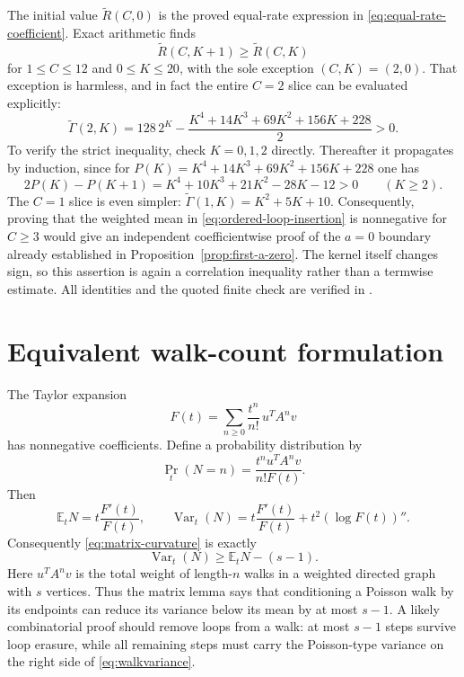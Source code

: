 \documentclass[11pt]{article}
\newcommand{\E}{\mathbb E}
\newcommand{\Var}{\operatorname{Var}}
\theoremstyle{remark}
\begin{document}
The initial value $\widetilde R(C,0)$ is the proved equal-rate expression
in \eqref{eq:equal-rate-coefficient}.  Exact arithmetic finds
\[
 \widetilde R(C,K+1)\geq\widetilde R(C,K)
\]
for $1\leq C\leq12$ and $0\leq K\leq20$, with the sole exception
$(C,K)=(2,0)$.  That exception is harmless, and in fact the entire
$C=2$ slice can be evaluated explicitly:
\begin{equation}\label{eq:ordered-C2-closed-form}
 \widetilde\Gamma(2,K)
 =128\,2^K-\frac{K^4+14K^3+69K^2+156K+228}{2}>0.
\end{equation}
To verify the strict inequality, check $K=0,1,2$ directly.  Thereafter it
propagates by induction, since for
$P(K)=K^4+14K^3+69K^2+156K+228$ one has
\[
 2P(K)-P(K+1)=K^4+10K^3+21K^2-28K-12>0
 \qquad(K\geq2).
\]
The $C=1$ slice is even simpler:
$\widetilde\Gamma(1,K)=K^2+5K+10$.
Consequently, proving that the weighted mean in
\eqref{eq:ordered-loop-insertion} is nonnegative for $C\geq3$ would give an
independent coefficientwise proof of the $a=0$ boundary already established
in Proposition~\ref{prop:first-a-zero}.  The kernel itself changes sign, so
this assertion is again a correlation inequality rather than a termwise
estimate.  All identities and the quoted finite check are verified
in .

\section{Equivalent walk-count formulation}

The Taylor expansion
\[
  F(t)=\sum_{n\geq0}\frac{t^n}{n!}\,u^TA^nv
\]
has nonnegative coefficients.  Define a probability distribution by
\[
  \Pr_t(N=n)=
  \frac{t^n u^TA^nv}{n!F(t)}.
\]
Then
\[
  \E_tN=t\frac{F'(t)}{F(t)},
  \qquad
  \Var_t(N)=t\frac{F'(t)}{F(t)}
             +t^2(\log F(t))''.
\]
Consequently \eqref{eq:matrix-curvature} is exactly
\begin{equation}\label{eq:walkvariance}
  \Var_t(N)\geq \E_tN-(s-1).
\end{equation}
Here \(u^TA^nv\) is the total weight of length-\(n\) walks in a weighted directed
graph with \(s\) vertices.  Thus the matrix lemma says that conditioning a
Poisson walk by its endpoints can reduce its variance below its mean by at most
\(s-1\).  A likely combinatorial proof should remove loops from a walk: at most
\(s-1\) steps survive loop erasure, while all remaining steps must carry the
Poisson-type variance on the right side of \eqref{eq:walkvariance}.
\end{document}
